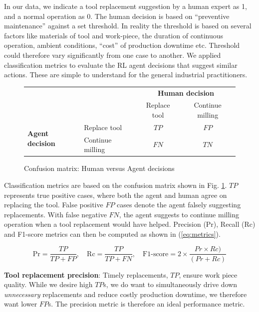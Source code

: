 \documentclass[a4paper, 12pt]{article}
\newcommand{\rowspace}[1]{\renewcommand{\arraystretch}{#1}}
\begin{document}
In our data, we indicate a tool replacement suggestion by a human expert as 1, and a normal operation as 0. The human decision is based on ``preventive maintenance'' against a set threshold. In reality the threshold is based on several factors like materials of tool and work-piece, the duration of continuous operation, ambient conditions, ``cost'' of production downtime etc. Threshold could therefore vary significantly from one case to another. We applied  classification metrics to evaluate the RL agent decisions that suggest similar actions. These are simple to understand for the general industrial practitioners.

\begin{figure}
	\begin{center}
		\sffamily
		\rowspace{1.6}
		\begin{tabular}{l|l|c|c|}
			\multicolumn{2}{c}{}&\multicolumn{2}{c}{\textbf{Human decision}}\\
			\cline{3-4}
			\multicolumn{2}{c|}{}&Replace tool&Continue milling\\
			\cline{2-4}
			\multirow{2}{*}{\textbf{Agent decision}}& Replace tool & $TP$ & $FP$\\
			\cline{2-4}
			& Continue milling& $FN$ & $TN$\\
			\cline{2-4}
		\end{tabular}
	\end{center}
	\caption{Confusion matrix: Human versus Agent decisions}
	\label{fig:CM}	
\end{figure}

Classification metrics are based on the confusion matrix shown in Fig. \ref{fig:CM}. $TP$ represents true positive cases, where both the agent and human agree on replacing the tool. False positive $FP$ cases denote the agent falsely suggesting replacements. With false negative $FN$, the agent suggests to continue milling operation when a tool replacement would have helped. Precision (Pr), Recall (Rc) and F1-score metrics can then be computed as shown in (\ref{eq:metrics}).

\begin{equation}
	\text{Pr} = \frac{TP}{TP+FP}, \quad
	\text{Rc} = \frac{TP}{TP+FN}, \quad
	\text{F1-score} = 2 \times \frac{Pr \times Rc)}{(Pr + Rc)}
	\label{eq:metrics}
\end{equation}

\textbf{Tool replacement precision}: Timely replacements, $TP$, ensure work piece quality. While we desire high $TP$s, we do want to simultaneously drive down \textit{unnecessary} replacements and reduce costly production downtime, we therefore want lower $FP$s. The precision metric is therefore an ideal performance metric. 
\end{document}
